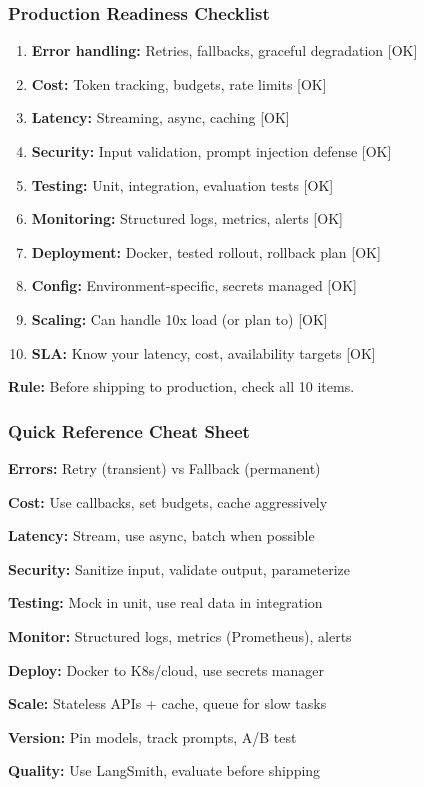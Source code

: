 \documentclass[aspectratio=169,11pt]{beamer}
\begin{document}
\begin{frame}
\frametitle{Production Readiness Checklist}

\small
\begin{enumerate}
  \setlength{\itemsep}{1pt}
  \item \textbf{Error handling:} Retries, fallbacks, graceful degradation [OK]
  \item \textbf{Cost:} Token tracking, budgets, rate limits [OK]
  \item \textbf{Latency:} Streaming, async, caching [OK]
  \item \textbf{Security:} Input validation, prompt injection defense [OK]
  \item \textbf{Testing:} Unit, integration, evaluation tests [OK]
  \item \textbf{Monitoring:} Structured logs, metrics, alerts [OK]
  \item \textbf{Deployment:} Docker, tested rollout, rollback plan [OK]
  \item \textbf{Config:} Environment-specific, secrets managed [OK]
  \item \textbf{Scaling:} Can handle 10x load (or plan to) [OK]
  \item \textbf{SLA:} Know your latency, cost, availability targets [OK]
\end{enumerate}

\vspace{0.5em}

\textbf{Rule:} Before shipping to production, check all 10 items.

\end{frame}

\begin{frame}
\frametitle{Quick Reference Cheat Sheet}

\small
\textbf{Errors:} Retry (transient) vs Fallback (permanent)

\textbf{Cost:} Use callbacks, set budgets, cache aggressively

\textbf{Latency:} Stream, use async, batch when possible

\textbf{Security:} Sanitize input, validate output, parameterize

\textbf{Testing:} Mock in unit, use real data in integration

\textbf{Monitor:} Structured logs, metrics (Prometheus), alerts

\textbf{Deploy:} Docker to K8s/cloud, use secrets manager

\textbf{Scale:} Stateless APIs + cache, queue for slow tasks

\textbf{Version:} Pin models, track prompts, A/B test

\textbf{Quality:} Use LangSmith, evaluate before shipping

\end{frame}
\end{document}
